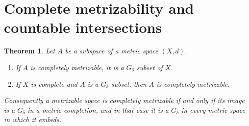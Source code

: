 \documentclass[11pt,oneside,openany]{book}
\newtheorem{theorem}{Theorem}[chapter]
\theoremstyle{definition}
\theoremstyle{remark}
\begin{document}
\section{Complete metrizability and countable intersections}
\begin{theorem}\label{d10:10:complete-gdelta}
Let $A$ be a subspace of a metric space $(X,d)$.
\begin{enumerate}[label=(\alph*)]
\item If $A$ is completely metrizable, it is a $G_\delta$ subset of $X$.
\item If $X$ is complete and $A$ is a $G_\delta$ subset, then $A$ is completely metrizable.
\end{enumerate}
Consequently a metrizable space is completely metrizable if and only if its image is a $G_\delta$ in a metric completion, and in that case it is a $G_\delta$ in every metric space in which it embeds.
\end{theorem}
\end{document}
